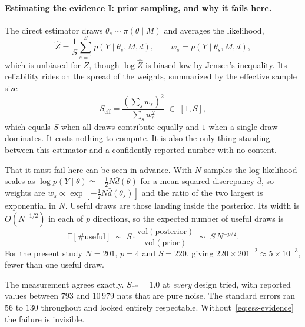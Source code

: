 \documentclass[10pt]{article}
\begin{document}
\paragraph{Estimating the evidence I: prior sampling, and why it fails here.}
The direct estimator draws $\theta_s \sim \pi(\theta \mid M)$ and averages the likelihood,
%
\begin{equation}
\hat Z = \frac{1}{S}\sum_{s=1}^{S} p(Y \mid \theta_s, M, d),
\qquad
w_s = p(Y \mid \theta_s, M, d),
\label{eq:prior-mc}
\end{equation}
%
which is unbiased for $Z$, though $\log \hat Z$ is biased low by Jensen's inequality. Its
reliability rides on the spread of the weights, summarized by the effective sample size
%
\begin{equation}
S_{\mathrm{eff}} = \frac{\left(\sum_s w_s\right)^2}{\sum_s w_s^2}
\;\in\; [1, S],
\label{eq:ess-evidence}
\end{equation}
%
which equals $S$ when all draws contribute equally and $1$ when a single draw dominates. It
costs nothing to compute. It is also the only thing standing between this estimator and a
confidently reported number with no content.

That it must fail here can be seen in advance. With $N$ samples the log-likelihood scales as
$\log p(Y\mid\theta) \simeq -\tfrac12 N \bar d(\theta)$ for a mean squared discrepancy
$\bar d$, so weights are $w_s \propto \exp[-\tfrac12 N \bar d(\theta_s)]$ and the ratio of the
two largest is exponential in $N$. Useful draws are those landing inside the posterior. Its
width is $O(N^{-1/2})$ in each of $p$ directions, so the expected number of useful draws is
%
\begin{equation}
\mathbb{E}[\#\text{useful}] \;\sim\; S \cdot \frac{\mathrm{vol}(\text{posterior})}
{\mathrm{vol}(\text{prior})} \;\sim\; S\,N^{-p/2}.
\label{eq:useful-draws}
\end{equation}
%
For the present study $N = 201$, $p = 4$ and $S = 220$, giving
$220 \times 201^{-2} \approx 5 \times 10^{-3}$, fewer than one useful draw.

The measurement agrees exactly. $S_{\mathrm{eff}} = 1.0$ at \emph{every} design tried, with
reported values between $793$ and $10\,979$ nats that are pure noise. The standard errors ran
$56$ to $130$ throughout and looked entirely respectable. Without~\eqref{eq:ess-evidence} the
failure is invisible.
\end{document}
